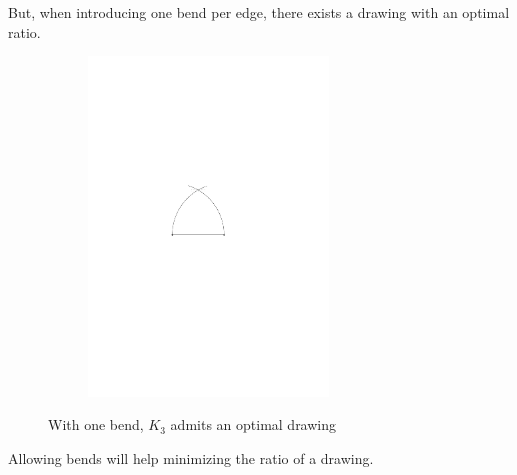 But, when introducing one bend per edge, there exists a drawing with an optimal ratio. 
\begin{figure}[H]
	\centering
	\begin{subfigure}{0.6\linewidth}
		\centering
		\includegraphics[width=0.7\textwidth,page=2]{drawings/small_example.pdf}
	\end{subfigure}
	\caption{With one bend, $K_3$ admits an optimal drawing}
\end{figure}
Allowing bends will help minimizing the ratio of a drawing. 